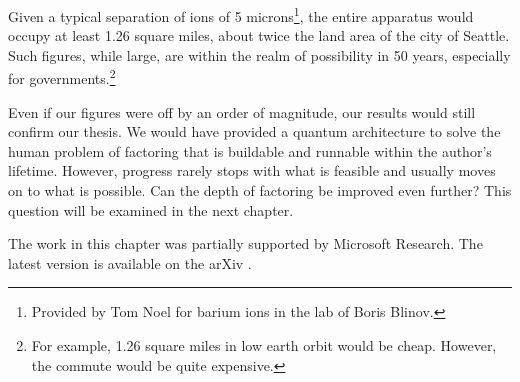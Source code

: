 Given a typical
separation of ions of 5 microns\footnote{Provided
by Tom Noel for barium ions in the lab of Boris Blinov.},
the entire apparatus would occupy at least 1.26
square miles, about twice the land area of the city
of Seattle. Such figures, while large, are
within the realm of possibility in 50 years, especially
for governments.\footnote{For example,
1.26 square miles in low earth orbit would be cheap.
However, the commute would be quite expensive.}

Even if our figures were off by an order of magnitude,
our results would still confirm our thesis. We
would have provided a quantum architecture to solve
the human problem of factoring that is
buildable and runnable within the author's lifetime.
However, progress rarely stops with what is
feasible and usually moves on to what is possible.
Can the depth of factoring be improved even further?
This question will be examined
in the next chapter.

The work in this chapter was partially supported by
Microsoft Research. The latest version is
available on the arXiv \cite{Pham2012}.